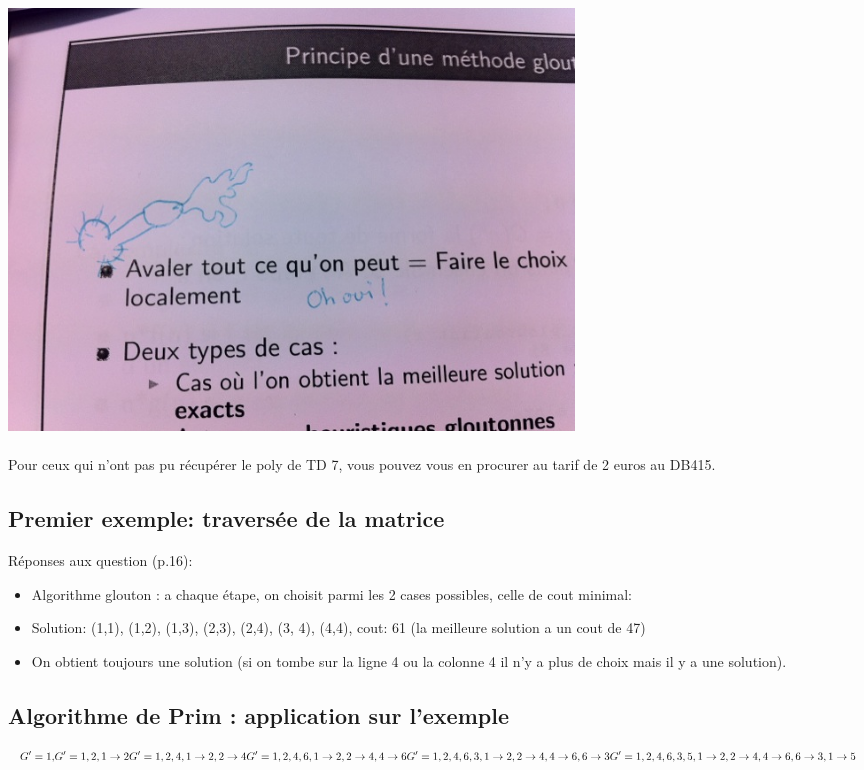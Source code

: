 \paragraph{}
\includegraphics[width=15cm]{avaler}

\paragraph{}
Pour ceux qui n'ont pas pu récupérer le poly de TD 7, vous pouvez vous en procurer
au tarif de 2 euros au DB415.

\subsection{Premier exemple: traversée de la matrice}
Réponses aux question (p.16):
\begin{itemize}
 \item Algorithme glouton : a chaque étape, on choisit parmi les 2 cases possibles, celle de cout minimal:
 \item Solution: (1,1), (1,2), (1,3), (2,3), (2,4), (3, 4), (4,4), cout: 61 (la meilleure solution a un cout de 47)
 \item On obtient toujours une solution (si on tombe sur la ligne 4 ou la colonne 4 il n'y a plus de choix mais il y a une solution).
\end{itemize}

\subsection{Algorithme de Prim : application sur l'exemple}
\[
G' = {1,\empty}
G' = {{1,2},{1\ra2}}
G' = {{1,2,4},{1\ra2,2\ra4}}
G' = {{1,2,4,6},{1\ra2,2\ra4,4\ra6}}
G' = {{1,2,4,6,3},{1\ra2,2\ra4,4\ra6,6\ra3}}
G' = {{1,2,4,6,3,5},{1\ra2,2\ra4,4\ra6,6\ra3,1\ra5}}
\]

